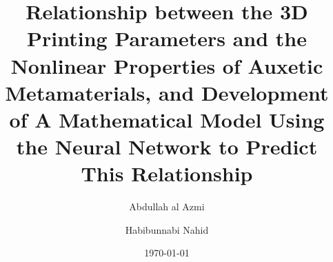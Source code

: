 \title{Relationship between the 3D Printing Parameters and the Nonlinear Properties of Auxetic Metamaterials, and Development of A Mathematical Model Using the Neural Network to Predict This Relationship}



\author[1]{Abdullah al Azmi}
\author[2]{Habibunnabi Nahid}


\date{\today}

\maketitle
